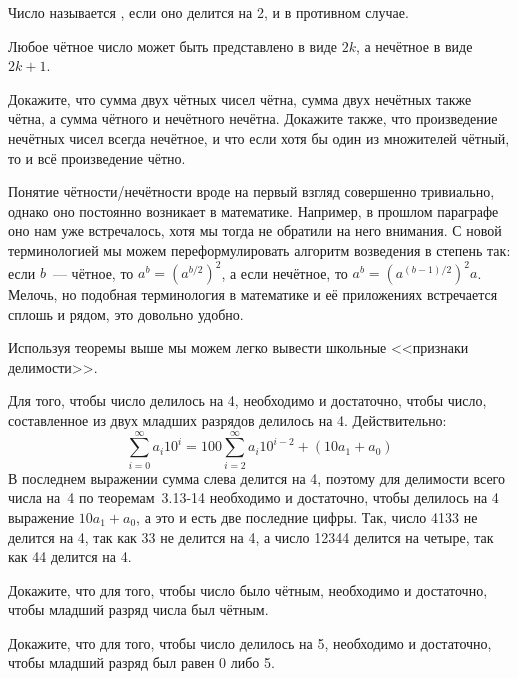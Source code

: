 \begin{definition}
Число называется , если оно делится на 2, и  в противном случае.
\end{definition}

Любое чётное число может быть представлено в виде $2k$, а нечётное в виде $2k+1$.

\begin{exercise}
Докажите, что сумма двух чётных чисел чётна, сумма двух нечётных также чётна, а сумма чётного и нечётного нечётна. Докажите также, что произведение нечётных чисел всегда нечётное, и что если хотя бы один из множителей чётный, то и всё произведение чётно.
\end{exercise}

Понятие чётности/нечётности вроде на первый взгляд совершенно тривиально, однако оно постоянно возникает в математике. Например, в прошлом параграфе оно нам уже встречалось, хотя мы тогда не обратили на него внимания. С новой терминологией мы можем переформулировать алгоритм возведения в степень так: если $b$~--- чётное, то $a^b = (a^{b/2})^2$, а если нечётное, то $a^b = (a^{(b-1)/2})^2 a$. Мелочь, но подобная терминология в математике и её приложениях встречается сплошь и рядом, это довольно удобно.

Используя теоремы выше мы можем легко вывести школьные <<признаки делимости>>.

\begin{example}
Для того, чтобы число делилось на 4, необходимо и достаточно, чтобы число, составленное из двух младших разрядов делилось на 4. Действительно:
$$\sum_{i=0}^\infty a_i 10^i = 100 \sum_{i = 2}^\infty a_i 10^{i-2} + (10a_1 + a_0)$$
В последнем выражении сумма слева делится на 4, поэтому для делимости всего числа на~4 по теоремам~3.13-14 необходимо и достаточно, чтобы делилось на 4 выражение $10a_1 + a_0$, а это и есть две последние цифры. Так, число 4133 не делится на 4, так как 33 не делится на 4, а число 12344 делится на четыре, так как 44 делится на 4.
\end{example}

\begin{exercise}
Докажите, что для того, чтобы число было чётным, необходимо и достаточно, чтобы младший разряд числа был чётным.
\end{exercise}

\begin{exercise}
Докажите, что для того, чтобы число делилось на 5, необходимо и достаточно, чтобы младший разряд был равен 0 либо 5.
\end{exercise}

